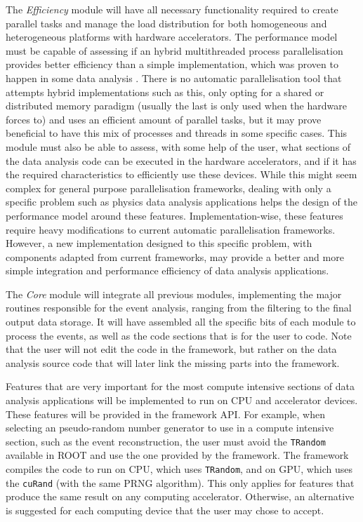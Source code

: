 The \textit{Efficiency} module will have all necessary functionality required to create parallel tasks and manage the load distribution for both homogeneous and heterogeneous platforms with hardware accelerators. The performance model must be capable of assessing if an hybrid multithreaded process parallelisation provides better efficiency than a simple implementation, which was proven to happen in some data analysis \cite{paperAMP}. There is no automatic parallelisation tool that attempts hybrid implementations such as this, only opting for a shared or distributed memory paradigm (usually the last is only used when the hardware forces to) and uses an efficient amount of parallel tasks, but it may prove beneficial to have this mix of processes and threads in some specific cases. This module must also be able to assess, with some help of the user, what sections of the data analysis code can be executed in the hardware accelerators, and if it has the required characteristics to efficiently use these devices. While this might seem complex for general purpose parallelisation frameworks, dealing with only a specific problem such as physics data analysis applications helps the design of the performance model around these features. Implementation-wise, these features require heavy modifications to current automatic parallelisation frameworks. However, a new implementation designed to this specific problem, with components adapted from current frameworks, may provide a better and more simple integration and performance efficiency of data analysis applications.

The \textit{Core} module will integrate all previous modules, implementing the major routines responsible for the event analysis, ranging from the filtering to the final output data storage. It will have assembled all the specific bits of each module to process the events, as well as the code sections that is for the user to code. Note that the user will not edit the code in the framework, but rather on the data analysis source code that will later link the missing parts into the framework.

Features that are very important for the most compute intensive sections of data analysis applications will be implemented to run on CPU and accelerator devices. These features will be provided in the framework API. For example, when selecting an pseudo-random number generator to use in a compute intensive section, such as the event reconstruction, the user must avoid the \texttt{TRandom} available in ROOT and use the one provided by the framework. The framework compiles the code to run on CPU, which uses \texttt{TRandom}, and on GPU, which uses the \texttt{cuRand} (with the same PRNG algorithm). This only applies for features that produce the same result on any computing accelerator. Otherwise, an alternative is suggested for each computing device that the user may chose to accept.


